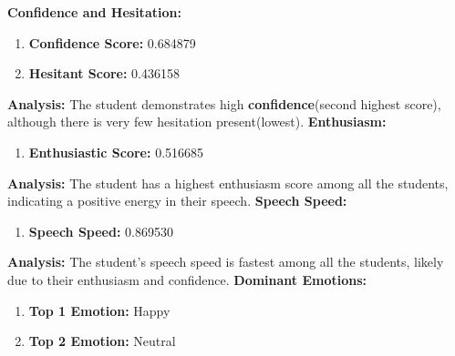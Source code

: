 \documentclass{article}
\begin{document}
\vspace{0.1in}
\large{\textbf{Confidence and Hesitation:}}
\begin{tcolorbox}[colback=green!10!white, colframe=green!80!black, title=Confidence and Hesitant Scores]
    \begin{enumerate}
        \item \textbf{Confidence Score:} \textcolor{green!50!black}{0.684879}
        \item \textbf{Hesitant Score:} \textcolor{red!70!black}{0.436158}
    \end{enumerate}
\end{tcolorbox}
    \textbf{Analysis:} The student demonstrates high \textbf{confidence}(second highest score), although there is very few hesitation present(lowest).
    \vspace{0.1in}
\large{\textbf{Enthusiasm:}}
\begin{tcolorbox}[colback=orange!10!white, colframe=orange!80!black, title=Enthusiastic Score]
    \begin{enumerate}
        \item \textbf{Enthusiastic Score:} \textcolor{orange!70!black}{0.516685}
    \end{enumerate}
\end{tcolorbox}
    \textbf{Analysis:} The student has a highest enthusiasm score among all the students, indicating a positive energy in their speech.
    \vspace{0.1in}
\large{\textbf{Speech Speed:}}
\begin{tcolorbox}[colback=purple!10!white, colframe=purple!80!black, title=Speech Speed]
    \begin{enumerate}
        \item \textbf{Speech Speed:} \textcolor{purple!70!black}{0.869530}
    \end{enumerate}
\end{tcolorbox}
    \textbf{Analysis:} The student's speech speed is fastest among all the students, likely due to their enthusiasm and confidence.
    \vspace{0.1in}
\large{\textbf{Dominant Emotions:}}
\begin{tcolorbox}[colback=pink!10!white, colframe=pink!80!black, title=Emotional State]
    \begin{enumerate}
        \item \textbf{Top 1 Emotion:} \textcolor{blue!80!black}{Happy}
        \item \textbf{Top 2 Emotion:} \textcolor{red!80!black}{Neutral}
    \end{enumerate}
\end{tcolorbox}
\end{document}
